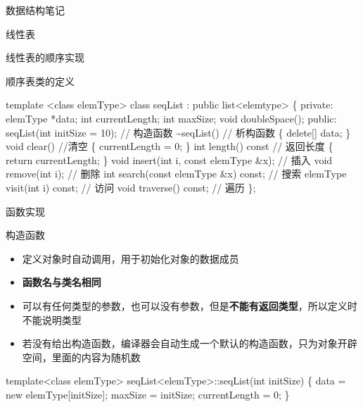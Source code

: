 \documentclass[
  ignorenonframetext,
]{beamer}
\newenvironment{Shaded}{}{}
\newcommand{\NormalTok}[1]{#1}
\providecommand{\tightlist}{%
  \setlength{\itemsep}{0pt}\setlength{\parskip}{0pt}}
\begin{document}
\begin{frame}[fragile]{数据结构笔记}
\begin{block}{线性表}
\begin{block}{线性表的顺序实现}
\begin{block}{顺序表类的定义}
\protect{}\label{ux987aux5e8fux8868ux7c7bux7684ux5b9aux4e49}
\begin{Shaded}
\begin{Highlighting}[]
\NormalTok{template \textless{}class elemType\textgreater{}}
\NormalTok{class seqList : public list\textless{}elemtype\textgreater{}}
\NormalTok{\{}
\NormalTok{  private:}
\NormalTok{    elemType *data;}
\NormalTok{    int currentLength;}
\NormalTok{    int maxSize;}
\NormalTok{    void doubleSpace();}
\NormalTok{  public:}
\NormalTok{    seqList(int initSize = 10);             // 构造函数}
\NormalTok{    \textasciitilde{}seqList()                              // 析构函数}
\NormalTok{    \{}
\NormalTok{      delete[] data;}
\NormalTok{    \}}
\NormalTok{    void clear()                            //清空}
\NormalTok{    \{}
\NormalTok{      currentLength = 0;}
\NormalTok{    \}}
\NormalTok{    int length() const                      // 返回长度}
\NormalTok{    \{}
\NormalTok{      return currentLength;}
\NormalTok{    \}}
\NormalTok{    void insert(int i, const elemType \&x);  // 插入}
\NormalTok{    void remove(int i);                     // 删除}
\NormalTok{    int search(const elemType \&x) const;    // 搜索}
\NormalTok{    elemType visit(int i) const;            // 访问}
\NormalTok{    void traverse() const;                  // 遍历}
\NormalTok{\};}
\end{Highlighting}
\end{Shaded}
\end{block}

\begin{block}{函数实现}
\protect{}\label{ux51fdux6570ux5b9eux73b0}
\begin{block}{构造函数}
\protect{}\label{ux6784ux9020ux51fdux6570}
\begin{itemize}
\tightlist
\item
  定义对象时自动调用，用于初始化对象的数据成员
\item
  \textbf{函数名与类名相同}
\item
  可以有任何类型的参数，也可以没有参数，但是\textbf{不能有返回类型}，所以定义时不能说明类型
\item
  若没有给出构造函数，编译器会自动生成一个默认的构造函数，只为对象开辟空间，里面的内容为随机数
\end{itemize}

\begin{Shaded}
\begin{Highlighting}[]
\NormalTok{template\textless{}class elemType\textgreater{}}
\NormalTok{seqList\textless{}elemType\textgreater{}::seqList(int initSize)}
\NormalTok{\{}
\NormalTok{  data = new elemType[initSize];}
\NormalTok{  maxSize = initSize;}
\NormalTok{  currentLength = 0;}
\NormalTok{\}}
\end{Highlighting}
\end{Shaded}


\end{block}
\end{block}
\end{block}
\end{block}
\end{frame}
\end{document}
